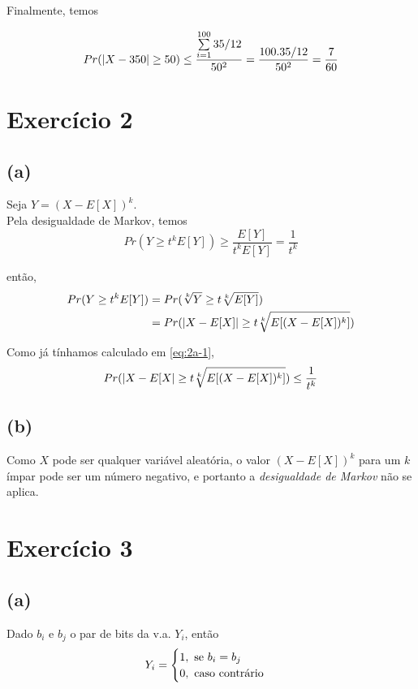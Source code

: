 \documentclass{article}
\begin{document}
Finalmente, temos

\begin{equation}
	\notag
	Pr(|X - 350|\geq50) \leq \dfrac{\sum\limits_{i=1}^{100} 35/12}{50^2} = \dfrac{100 . 35/12}{50^2} = \dfrac{7}{60}
\end{equation}

\section{Exercício 2}
\subsection*{(a)}
Seja $Y = (X - E[X])^k$.\\

Pela desigualdade de Markov, temos
\begin{equation}
	\label{eq:2a-1}
	Pr(Y \geq t^kE[Y]) \geq \dfrac{E[Y]}{t^k E[Y]} = \dfrac{1}{t^k}
\end{equation}

então,
\begin{equation}
	\notag
	\begin{split}
		Pr(Y \geq t^kE[Y]) &= Pr(\sqrt[k]{Y} \geq t \sqrt[k]{E[Y]})\\
		&= Pr(|X - E[X]| \geq t \sqrt[k]{E[(X - E[X])^k]})
	\end{split}
\end{equation}

Como já tínhamos calculado em \ref{eq:2a-1},
\begin{equation}
	\notag
	Pr(|X - E[X| \geq t \sqrt[k]{E[(X - E[X])^k]} ) \leq \dfrac{1}{t^k}
\end{equation}

\subsection*{(b)}
Como $X$ pode ser qualquer variável aleatória, o valor $(X - E[X])^k$ para um $k$
ímpar pode ser um número negativo, e portanto a \emph{desigualdade de Markov} não se aplica.

\section{Exercício 3}
\subsection*{(a)}
Dado $b_i$ e $b_j$ o par de bits da v.a. $Y_i$, então
\begin{equation}
	\notag
	Y_i =\begin{cases}
		1, \text{ se }b_i = b_j\\
		0, \text{ caso contrário}
	\end{cases}
\end{equation}
\end{document}
